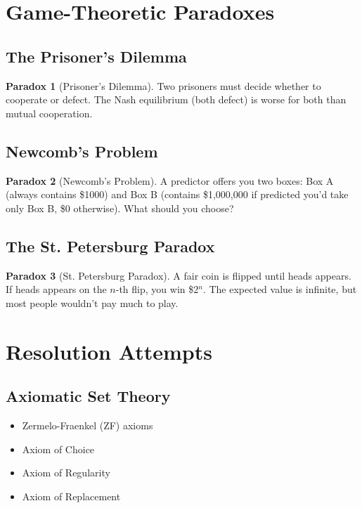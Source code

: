 \documentclass[11pt]{article}
\theoremstyle{definition}
\newtheorem{paradox}{Paradox}[section]
\begin{document}
\section{Game-Theoretic Paradoxes}

\subsection{The Prisoner's Dilemma}
\begin{paradox}[Prisoner's Dilemma]
Two prisoners must decide whether to cooperate or defect. The Nash equilibrium (both defect) is worse for both than mutual cooperation.
\end{paradox}

\subsection{Newcomb's Problem}
\begin{paradox}[Newcomb's Problem]
A predictor offers you two boxes: Box A (always contains \$1000) and Box B (contains \$1,000,000 if predicted you'd take only Box B, \$0 otherwise). What should you choose?
\end{paradox}

\subsection{The St. Petersburg Paradox}
\begin{paradox}[St. Petersburg Paradox]
A fair coin is flipped until heads appears. If heads appears on the $n$-th flip, you win \$2$^n$. The expected value is infinite, but most people wouldn't pay much to play.
\end{paradox}

\section{Resolution Attempts}

\subsection{Axiomatic Set Theory}
\begin{itemize}
    \item Zermelo-Fraenkel (ZF) axioms
    \item Axiom of Choice
    \item Axiom of Regularity
    \item Axiom of Replacement
\end{itemize}
\end{document}
